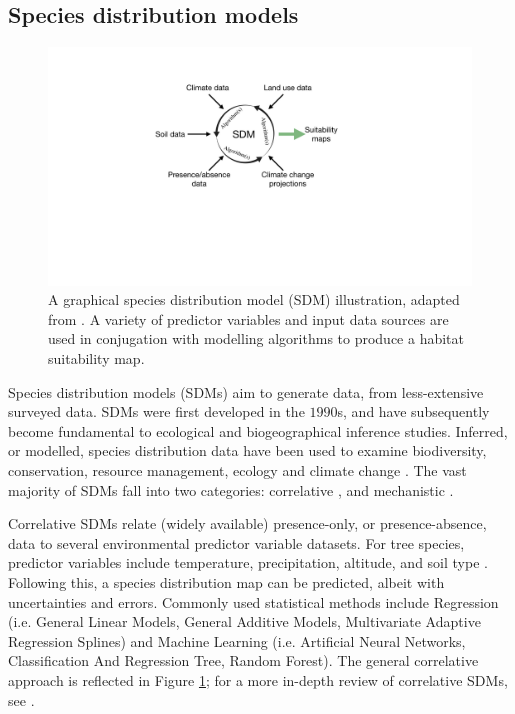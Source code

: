 \subsection{Species distribution models}

\begin{figure}
    \centering
    \includegraphics[scale=0.35]{chapter2/figures/SDM-fig.pdf}
    \caption{A graphical species distribution model (SDM) illustration, adapted from \cite{SDM_1}. 
             A variety of predictor variables and input data sources are used in conjugation with modelling algorithms to produce
             a habitat suitability map.}
    \label{fig:sdm}
\end{figure}

Species distribution models (SDMs) aim to generate data, from less-extensive surveyed data.
SDMs were first developed in the $1990$s, and have subsequently become fundamental to ecological and biogeographical inference studies.
Inferred, or modelled, species distribution data have been used to examine biodiversity, conservation, resource management, 
ecology and climate change \cite{austin2011improving, franklin2013species, skov2016real, wittmann2016confronting, 10.3958/059.037.0110, zhang2019using}.
The vast majority of SDMs fall into two categories: correlative \cite{srivastava2019species}, and mechanistic \cite{shabani2016comparison}.

Correlative SDMs relate (widely available) presence-only, or presence-absence, data to several environmental predictor variable datasets.
For tree species, predictor variables include temperature, precipitation, altitude, and soil type \cite{ray2021multi, hill.data}.
Following this, a species distribution map can be predicted, albeit with  uncertainties and errors.
Commonly used statistical methods include Regression 
(i.e. General Linear Models, General Additive Models, Multivariate Adaptive Regression Splines) and Machine Learning
(i.e. Artificial Neural Networks, Classification And Regression Tree, Random Forest). 
The general correlative approach is reflected in Figure \ref{fig:sdm}; for a more in-depth review of correlative SDMs, see \cite{SDM_1}.

